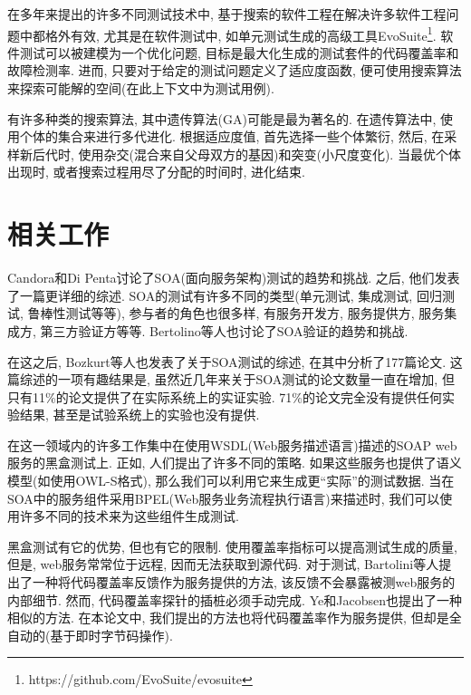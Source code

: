         在多年来提出的许多不同测试技术中, 基于搜索的软件工程在解决许多软件工程问题中都格外有效\cite{harman2012search}, 尤其是在软件测试中\cite{ali2010systematic}, 如单元测试生成的高级工具EvoSuite\footnote{ https://github.com/EvoSuite/evosuite}\cite{fraser2011evosuite}\cite{fraser2014large}. 软件测试可以被建模为一个优化问题, 目标是最大化生成的测试套件的代码覆盖率和故障检测率. 进而, 只要对于给定的测试问题定义了适应度函数, 便可使用搜索算法来探索可能解的空间(在此上下文中为测试用例). 
        
        有许多种类的搜索算法, 其中遗传算法(GA)可能是最为著名的. 在遗传算法中, 使用个体的集合来进行多代进化. 根据适应度值, 首先选择一些个体繁衍, 然后, 在采样新后代时, 使用杂交(混合来自父母双方的基因)和突变(小尺度变化). 当最优个体出现时, 或者搜索过程用尽了分配的时间时, 进化结束.

\section{相关工作}
  Candora和Di Penta讨论了SOA(面向服务架构)测试的趋势和挑战\cite{canfora2006testing}. 之后, 他们发表了一篇更详细的综述\cite{canfora2006service}. SOA的测试有许多不同的类型(单元测试, 集成测试, 回归测试, 鲁棒性测试等等), 参与者的角色也很多样, 有服务开发方, 服务提供方, 服务集成方, 第三方验证方等等. Bertolino等人\cite{bertolino2012trends}也讨论了SOA验证的趋势和挑战. 
    
    在这之后, Bozkurt等人\cite{bozkurt2013testing}也发表了关于SOA测试的综述, 在其中分析了177篇论文. 这篇综述的一项有趣结果是, 虽然近几年来关于SOA测试的论文数量一直在增加, 但只有11\%的论文提供了在实际系统上的实证实验. 71\%的论文完全没有提供任何实验结果, 甚至是试验系统上的实验也没有提供. 
    
    在这一领域内的许多工作集中在使用WSDL(Web服务描述语言)描述的SOAP web服务的黑盒测试上. 正如\cite{xu2005testing}\cite{bai2005wsdl}\cite{martin2006automated}\cite{ma2008wsdl}\cite{bartolini2009ws}\cite{li2016generating}, 人们提出了许多不同的策略. 如果这些服务也提供了语义模型(如使用OWL-S格式), 那么我们可以利用它来生成更“实际”的测试数据\cite{bozkurt2011automatically}. 当在SOA中的服务组件采用BPEL(Web服务业务流程执行语言)来描述时, 我们可以使用许多不同的技术来为这些组件生成测试\cite{wotawa2013fifty}\cite{jehan2014soa}. 
    
    黑盒测试有它的优势, 但也有它的限制. 使用覆盖率指标可以提高测试生成的质量, 但是, web服务常常位于远程, 因而无法获取到源代码. 对于测试, Bartolini等人\cite{bartolini2011bringing}提出了一种将代码覆盖率反馈作为服务提供的方法, 该反馈不会暴露被测web服务的内部细节. 然而, 代码覆盖率探针的插桩必须手动完成. Ye和Jacobsen\cite{ye2013whitening}也提出了一种相似的方法. 在本论文中, 我们提出的方法也将代码覆盖率作为服务提供, 但却是全自动的(基于即时字节码操作). 
    
